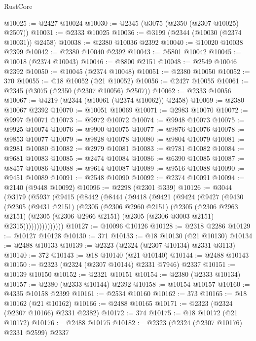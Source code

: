 \begin{lexlean}{RustCore}
\begin{coremodule}
@10025 := @2427 @10024
@10030 := @2345 (@3075 (@2350 (@2307 @10025) @2507))
@10031 := @2333 @10025
@10036 := @3199 (@2344 (@10030 (@2374 @10031)) @2458)
@10038 := @2380 @10036 @2392
@10040 := @10020 @10038 @2399
@10042 := @2380 @10040 @2392
@10043 := @5801 @10042
@10045 := @10018 (@2374 @10043)
@10046 := @8800 @2151
@10048 := @2549 @10046 @2392
@10050 := @10045 (@2374 @10048)
@10051 := @2380 @10050
@10052 := 370
@10055 := @18 @10052 (@21 @10052)
@10056 := @2427 @10055
@10061 := @2345 (@3075 (@2350 (@2307 @10056) @2507))
@10062 := @2333 @10056
@10067 := @4219 (@2344 (@10061 (@2374 @10062)) @2458)
@10069 := @2380 @10067 @2392
@10070 := @10051 @10069
@10071 := @2983 @10070
@10072 := @9997 @10071
@10073 := @9972 @10072
@10074 := @9948 @10073
@10075 := @9925 @10074
@10076 := @9900 @10075
@10077 := @9876 @10076
@10078 := @9853 @10077
@10079 := @9828 @10078
@10080 := @9804 @10079
@10081 := @2981 @10080
@10082 := @2979 @10081
@10083 := @9781 @10082
@10084 := @9681 @10083
@10085 := @2474 @10084
@10086 := @6390 @10085
@10087 := @8457 @10086
@10088 := @9614 @10087
@10089 := @9516 @10088
@10090 := @9451 @10089
@10091 := @2548 @10090
@10092 := @2374 @10091
@10094 := @2140 (@9448 @10092)
@10096 := @2298 (@2301 @339)
@10126 := @3044
    (@3179
      (@5937
        (@9415
          (@8442
            (@8444
              (@9418
                (@9421
                  (@9424
                    (@9427
                      (@9430
                        (@2305
                          (@9431 @2151)
                          (@2305
                            (@2306 @2960 @2151)
                            (@2305
                              (@2306 @2963 @2151)
                              (@2305
                                (@2306 @2966 @2151)
                                (@2305 (@2306 @3003 @2151) @2315)))))))))))))))
@10127 := @10096 @10126
@10128 := @2318 @2286
@10129 := @10127 @10128
@10130 := 371
@10133 := @18 @10130 (@21 @10130)
@10134 := @2488 @10133
@10139 := @2323 (@2324 (@2307 @10134) @2331 @3113)
@10140 := 372
@10143 := @18 @10140 (@21 @10140)
@10144 := @2488 @10143
@10150 := @2323 (@2324 (@2307 @10144) @2331 @7946) @2337
@10151 := @10139 @10150
@10152 := @2321 @10151
@10154 := @2380 (@2333 @10134)
@10157 := @2380 (@2333 @10144) @2392
@10158 := @10154 @10157
@10160 := @4335 @10158 @2399
@10161 := @2534 @10160
@10162 := 373
@10165 := @18 @10162 (@21 @10162)
@10166 := @2488 @10165
@10171 := @2323 (@2324 (@2307 @10166) @2331 @2382)
@10172 := 374
@10175 := @18 @10172 (@21 @10172)
@10176 := @2488 @10175
@10182 := @2323 (@2324 (@2307 @10176) @2331 @2599) @2337

\end{coremodule}
\end{lexlean}
